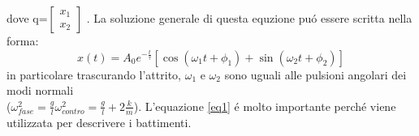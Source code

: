 \documentclass{exam}
\begin{document}
		dove q=$
		\begin{bmatrix}
			x_1 \\
			x_2
		\end{bmatrix}$
		. La soluzione generale di questa equzione pu\'o essere scritta nella forma:
		\begin{equation}
			\label{eq1}
			x(t)= A_0 e^{-\frac{t}{\tau}}[\cos(\omega_1 t + \phi_1) +\sin(\omega_2 t + \phi_2) ]
		\end{equation}
		in particolare trascurando l'attrito, $\omega_1$ e $\omega_2$ sono uguali alle pulsioni angolari dei modi normali\\($\omega_{fase}^2=\frac{g}{l} \omega_{contro}^2=\frac{g}{l}+2\frac{k}{m} $). L'equazione \ref{eq1} \'e molto importante perch\'e viene utilizzata per descrivere i battimenti.
\end{document}
